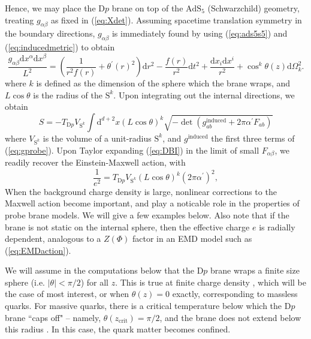 \documentclass[10pt, oneside]{book}
\begin{document}
\begin{doublespace}
Hence, we may place the D$p$ brane on top of the $\mathrm{AdS}_5$ (Schwarzchild) geometry, treating $g_{\alpha\beta}$ as fixed in (\ref{eq:Xdet}).   Assuming spacetime translation symmetry in the boundary directions,  $g_{\alpha\beta}$ is immediately found by using (\ref{eq:ads5s5}) and (\ref{eq:inducedmetric}) to obtain \begin{equation}
\frac{g_{\alpha\beta}\mathrm{d}x^\alpha \mathrm{d}x^\beta}{L^2} = \left(\frac{1}{r^2f(r)} + \theta^\prime(r)^2\right)\mathrm{d}r^2 - \frac{f(r)}{r^2} \mathrm{d}t^2 + \frac{\mathrm{d}x_i \mathrm{d}x^i}{r^2} + \cos^k \theta(z) \mathrm{d}\Omega_k^2.  \label{eq:gprobe}
\end{equation}
where $k$ is defined as the dimension of the sphere which the brane wraps, and $L \cos\theta$ is the radius of the $\mathrm{S}^k$.   Upon integrating out the internal directions, we obtain \begin{equation}
S = -T_{\mathrm{D}p} V_{\mathrm{S}^k}  \int \mathrm{d}^{d+2}x (L\cos\theta)^k \sqrt{-\det(g^{\mathrm{induced}}_{ab}+2\pi\alpha^\prime F_{ab})}
\end{equation}
where $V_{\mathrm{S}^k}$ is the volume of a unit-radius $\mathrm{S}^k$, and $g^{\mathrm{induced}}$ the first three terms of (\ref{eq:gprobe}).  Upon Taylor expanding (\ref{eq:DBI}) in the limit of small $F_{\alpha\beta}$, we readily recover the Einstein-Maxwell action, with \begin{equation}
\frac{1}{e^2} = T_{\mathrm{D}p}V_{\mathrm{S}^k} (L\cos\theta)^k (2\pi \alpha^\prime)^2,
\end{equation} 
When the background charge density is large, nonlinear corrections to the Maxwell action become important, and play a noticable role in the properties of probe brane models.   We will give a few examples below.   Also note that if the brane is not static on the internal sphere,  then the effective charge $e$ is radially dependent, analogous to a $Z(\Phi)$ factor in an EMD model such as (\ref{eq:EMDaction}).

We will assume in the computations below that the D$p$ brane wraps a finite size sphere (i.e. $|\theta|<\pi/2$) for all $z$.   This is true at finite charge density \cite{Kobayashi:2006sb}, which will be the case of most interest,  or when $\theta(z)=0$ exactly, corresponding to massless quarks.    For massive quarks, there is a critical temperature below which the D$p$ brane ``caps off" -- namely, $\theta(z_{\mathrm{crit}}) = \pi/2$, and the brane does not extend below this radius \cite{Albash:2006ew, Karch:2006bv}.   In this case, the quark matter becomes confined.





\end{doublespace}
\end{document}

